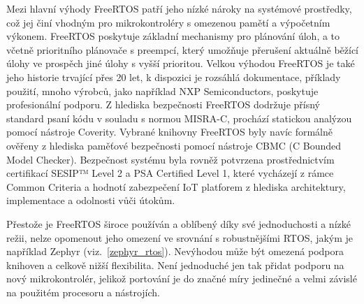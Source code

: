 Mezi hlavní výhody FreeRTOS patří jeho nízké nároky na systémové prostředky, což jej činí vhodným pro mikrokontroléry s omezenou pamětí a výpočetním výkonem. FreeRTOS poskytuje základní mechanismy pro plánování úloh, a to včetně prioritního plánovače s preempcí, který umožňuje přerušení aktuálně běžící úlohy ve prospěch jiné úlohy s vyšší prioritou. Velkou výhodou FreeRTOS je také jeho historie trvající přes 20 let, k dispozici je rozsáhlá dokumentace, příklady použití, mnoho výrobců, jako například NXP Semiconductors, poskytuje profesionální podporu. Z hlediska bezpečnosti FreeRTOS dodržuje přísný standard psaní kódu v souladu s normou MISRA-C, prochází statickou analýzou pomocí nástroje Coverity. Vybrané knihovny FreeRTOS byly navíc formálně ověřeny z hlediska paměťové bezpečnosti pomocí nástroje CBMC (C Bounded Model Checker). Bezpečnost systému byla rovněž potvrzena prostřednictvím certifikací SESIP™ Level 2 a PSA Certified Level 1, které vycházejí z rámce Common Criteria a hodnotí zabezpečení IoT platforem z hlediska architektury, implementace a odolnosti vůči útokům. \cite{freertos_security}

Přestože je FreeRTOS široce používán a oblíbený díky své jednoduchosti a nízké režii, nelze opomenout jeho omezení ve srovnání s robustnějšími RTOS, jakým je například Zephyr (viz.~\ref{zephyr_rtos}). Nevýhodou může být omezená podpora knihoven a celkově nižší flexibilita. Není jednoduché jen tak přidat podporu na nový mikrokontrolér, jelikož portování je do značné míry jedinečné a velmi závislé na použitém procesoru a nástrojích. \cite{freertos_portability, freertos_vs_zephyr}



